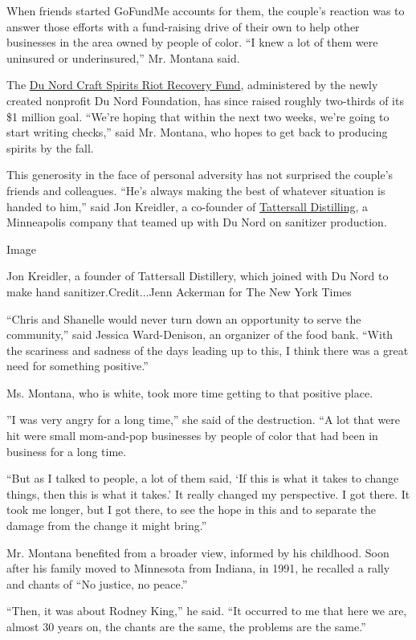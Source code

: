 When friends started GoFundMe accounts for them, the couple's reaction
was to answer those efforts with a fund-raising drive of their own to
help other businesses in the area owned by people of color. ``I knew a
lot of them were uninsured or underinsured,'' Mr. Montana said.

The \href{https://www.gofundme.com/f/minnesota-poc-business-support}{Du
Nord Craft Spirits Riot Recovery Fund}, administered by the newly
created nonprofit Du Nord Foundation, has since raised roughly
two-thirds of its \$1 million goal. ``We're hoping that within the next
two weeks, we're going to start writing checks,'' said Mr. Montana, who
hopes to get back to producing spirits by the fall.

This generosity in the face of personal adversity has not surprised the
couple's friends and colleagues. ``He's always making the best of
whatever situation is handed to him,'' said Jon Kreidler, a co-founder
of \href{https://www.tattersalldistilling.com/}{Tattersall Distilling},
a Minneapolis company that teamed up with Du Nord on sanitizer
production.

Image

Jon Kreidler, a founder of Tattersall Distillery, which joined with Du
Nord to make hand sanitizer.Credit...Jenn Ackerman for The New York
Times

``Chris and Shanelle would never turn down an opportunity to serve the
community,'' said Jessica Ward-Denison, an organizer of the food bank.
``With the scariness and sadness of the days leading up to this, I think
there was a great need for something positive.''

Ms. Montana, who is white, took more time getting to that positive
place.

''I was very angry for a long time,'' she said of the destruction. ``A
lot that were hit were small mom-and-pop businesses by people of color
that had been in business for a long time.

``But as I talked to people, a lot of them said, `If this is what it
takes to change things, then this is what it takes.' It really changed
my perspective. I got there. It took me longer, but I got there, to see
the hope in this and to separate the damage from the change it might
bring.''

Mr. Montana benefited from a broader view, informed by his childhood.
Soon after his family moved to Minnesota from Indiana, in 1991, he
recalled a rally and chants of ``No justice, no peace.''

``Then, it was about Rodney King,'' he said. ``It occurred to me that
here we are, almost 30 years on, the chants are the same, the problems
are the same.''

